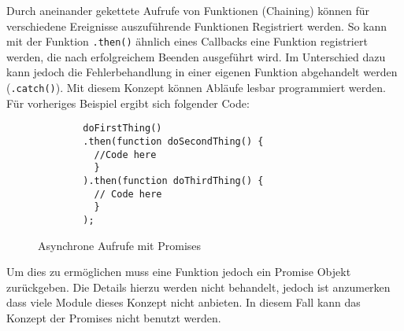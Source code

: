 Durch aneinander gekettete Aufrufe von Funktionen (Chaining) können für
verschiedene Ereignisse auszuführende Funktionen Registriert werden. So
kann mit der Funktion \texttt{.then()} ähnlich eines Callbacks eine
Funktion registriert werden, die nach erfolgreichem Beenden ausgeführt
wird. Im Unterschied dazu kann jedoch die Fehlerbehandlung in einer
eigenen Funktion abgehandelt werden (\texttt{.catch()}). Mit diesem
Konzept können Abläufe lesbar programmiert werden. Für vorheriges
Beispiel ergibt sich folgender Code:

\begin{figure}[t]
	\centering
	\begin{lstlisting}
        doFirstThing()
        .then(function doSecondThing() {
          //Code here
          }
        ).then(function doThirdThing() {
          // Code here
          }
        );
    \end{lstlisting}
	\caption[node-example-4]{Asynchrone Aufrufe mit Promises}
	\label{f:node-example-4}
\end{figure}

Um dies zu ermöglichen muss eine Funktion jedoch ein Promise Objekt
zurückgeben. Die Details hierzu werden nicht behandelt, jedoch ist
anzumerken dass viele Module dieses Konzept nicht anbieten. In diesem
Fall kann das Konzept der Promises nicht benutzt werden.

